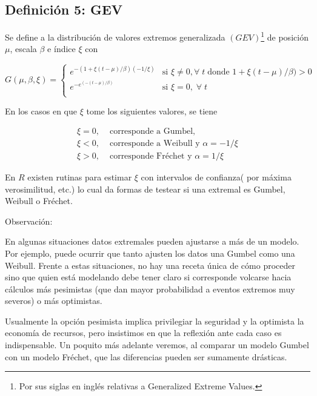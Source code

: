 \documentclass[
  oneside]{book}
\begin{document}
\hypertarget{definiciuxf3n-5-gev}{%
\subsection{Definición 5: GEV}\label{definiciuxf3n-5-gev}}

Se define a la distribución de valores extremos generalizada
\((GEV)\)\footnote{Por sus siglas en inglés relativas a Generalized Extreme Values.}
de posición \(\mu\), escala \(\beta\) e índice \(\xi\) con

\[
G(\mu,\beta,\xi) =
\begin{cases}
    e^{-(1+ \xi(t-\mu)/ \beta)(-1/ \xi)} & \text{si  } \xi \neq 0, \forall\;t\;\text{donde } 1+ \xi(t-\mu)/ \beta) >0 \\
    e^{-e^{(-(t-\mu)/ \beta)}} & \text{si  } \xi =0,\; \forall \;t \\
\end{cases}
\] \vspace{0.5cm}

En los casos en que \(\xi\) tome los siguientes valores, se tiene

\begin{align*}
 \xi=0,  & \text{ corresponde a Gumbel,} \\
 \xi< 0, &\text{ corresponde a Weibull y } \alpha=-1/ \xi \\
 \xi>0, &\text{ corresponde Fréchet y }  \alpha=1/ \xi
\end{align*}

En \(R\) existen rutinas para estimar \(\xi\) con intervalos de
confianza( por máxima verosimilitud, etc.) lo cual da formas de testear
si una extremal es Gumbel, Weibull o Fréchet.

Observación:

En algunas situaciones datos extremales pueden ajustarse a más de un
modelo. Por ejemplo, puede ocurrir que tanto ajusten los datos una
Gumbel como una Weibull. Frente a estas situaciones, no hay una receta
única de cómo proceder sino que quien está modelando debe tener claro si
corresponde volcarse hacia cálculos más pesimistas (que dan mayor
probabilidad a eventos extremos muy severos) o más optimistas.

Usualmente la opción pesimista implica privilegiar la seguridad y la
optimista la economía de recursos, pero insistimos en que la reflexión
ante cada caso es indispensable. Un poquito más adelante veremos, al
comparar un modelo Gumbel con un modelo Fréchet, que las diferencias
pueden ser sumamente drásticas.
\end{document}
